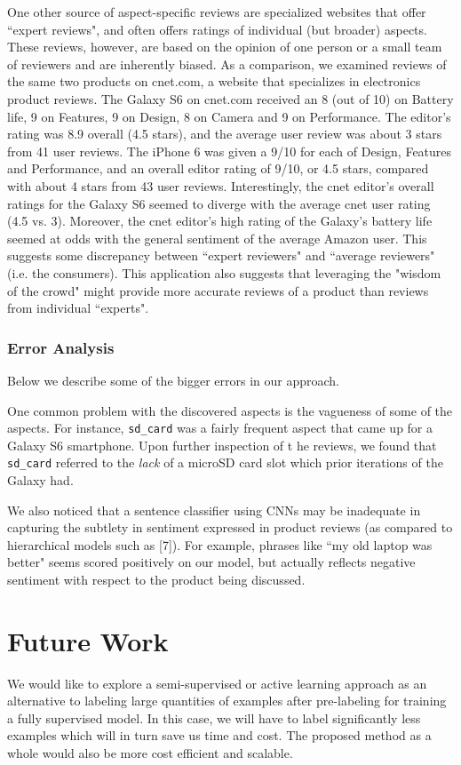 \documentclass{article} %
\begin{document}
One other source of aspect-specific reviews are specialized websites that offer ``expert reviews", and often offers ratings of individual (but broader) aspects. These reviews, however, are based on the opinion of one person or a small team of reviewers and are inherently biased. As a comparison, we examined reviews of the same two products on cnet.com, a website that specializes in electronics product reviews. The Galaxy S6 on cnet.com received an 8 (out of 10) on Battery life, 9 on Features, 9 on Design, 8 on Camera and 9 on Performance. The editor's rating was 8.9 overall (4.5 stars), and the average user review was about 3 stars from 41 user reviews. The iPhone 6 was given a 9/10 for each of Design, Features and Performance, and an overall editor rating of 9/10, or 4.5 stars, compared with about 4 stars from 43 user reviews. Interestingly, the cnet editor's overall ratings for the Galaxy S6 seemed to diverge with the average cnet user rating (4.5 vs. 3). Moreover, the cnet editor's high rating of the Galaxy's battery life seemed at odds with the general sentiment of the average Amazon user. This suggests some discrepancy between ``expert reviewers" and ``average reviewers" (i.e. the consumers). This application also suggests that leveraging the "wisdom of the crowd" might provide more accurate reviews of a product than reviews from individual ``experts".

\subsubsection{Error Analysis}
Below we describe some of the bigger errors in our approach.

One common problem with the discovered aspects is the vagueness of some of the aspects. For instance, \texttt{sd\_card} was a fairly frequent aspect that came up for a Galaxy S6 smartphone. Upon further inspection of t
he reviews, we found that \texttt{sd\_card} referred to the \textit{lack} of a microSD card slot which prior iterations of the Galaxy had.

We also noticed that a sentence classifier using CNNs may be inadequate in capturing the subtlety in sentiment expressed in product reviews (as compared to hierarchical models such as [7]). For example, phrases like ``my old laptop was better" seems scored positively on our model, but actually reflects negative sentiment with respect to the product being discussed.

\section{Future Work}
We would like to explore a semi-supervised or active learning approach as an alternative to labeling large quantities of examples after pre-labeling for training a fully supervised model. In this case, we will have to label significantly less examples which will in turn save us time and cost. The proposed method as a whole would also be more cost efficient and scalable.
\end{document}
